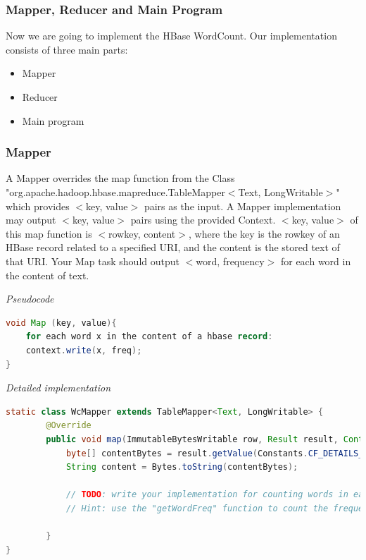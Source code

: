 \subsubsection{Mapper, Reducer and Main Program }

Now we are going to implement the HBase WordCount. Our implementation consists
of three main parts:

\begin{itemize}
\item Mapper
\item Reducer
\item Main program
 \end{itemize}
 
 
\subsubsection{Mapper}
A Mapper overrides the map function from the Class
"org.apache.hadoop.hbase.mapreduce.TableMapper$<$Text, LongWritable$>$" which
provides $<$key, value$>$ pairs as the input. A Mapper implementation may
output $<$key, value$>$ pairs using the provided Context.  $<$key, value$>$ of
this map function is $<$rowkey, content$>$, where the key is the rowkey of an
HBase record related to a specified URI, and the content is the stored text of
that URI. Your Map task should output $<$word, frequency$>$ for each word in
the content of text.

\textit{Pseudocode}
\begin{lstlisting}[language=java] 
void Map (key, value){
    for each word x in the content of a hbase record:
    context.write(x, freq);
}
\end{lstlisting}
 
\textit{Detailed implementation}
\begin{lstlisting}[language=java] 
static class WcMapper extends TableMapper<Text, LongWritable> {
		@Override
		public void map(ImmutableBytesWritable row, Result result, Context context) throws IOException, InterruptedException {
			byte[] contentBytes = result.getValue(Constants.CF_DETAILS_BYTES, Constants.QUAL_CONTENT_BYTES);
			String content = Bytes.toString(contentBytes);
			
			// TODO: write your implementation for counting words in each row, and generating a <word, count> pair
			// Hint: use the "getWordFreq" function to count the frequencies of words in content
 
		}
}
\end{lstlisting}

